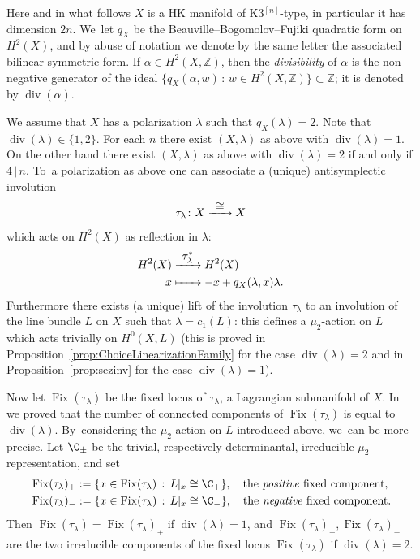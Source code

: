 \documentclass[JEP,XML,SOM,Unicode,published]{cedram}
\newcommand\To[1]{\mathchoice{\xrightarrow{\textstyle\kern4pt#1\kern3pt}}{\stackrel{#1}{\longrightarrow}}{}{}}
\newcommand\Mto[1]{\mathrel{\mapstochar\To{#1}}}
\newcommand{\HK}{\textup{HK}\xspace}
\newcommand{\ZZ}{{\mathbb Z}}\let\Z\ZZ
\DeclareMathOperator{\divisore}{div}\let\div\divisore
\DeclareMathOperator{\Fix}{Fix}
\theoremstyle{definition}
\begin{document}
Here and in what follows $X$ is a \HK manifold of K3$^{[n]}$-type, in particular it has dimension $2n$. We~let $q_X$ be the Beauville--Bogomolov--Fujiki quadratic form on $H^2(X)$, and by abuse of notation we denote by the same letter the associated bilinear symmetric form.
If $\alpha\in H^2(X,\ZZ)$, then the \emph{divisibility} of $\alpha$ is the non negative generator of the ideal $\{q_X(\alpha,w)\,:\,w\in H^2(X,\ZZ)\}\subset\ZZ$; it is denoted by $\divisore(\alpha)$.

We assume that $X$ has a polarization $\lambda$ such that $q_X(\lambda)=2$. Note that $\divisore(\lambda)\in\{1,2\}$. For each $n$ there exist $(X,\lambda)$ as above with
$\divisore(\lambda)=1$. On the other hand there exist $(X,\lambda)$ as above with
$\divisore(\lambda)=2$ if and only if
$4\,|\,n$. To~a polarization as above one can associate a (unique) antisymplectic involution
\[
\tau_{\lambda}\colon X\To{\cong}X
\]
which acts on $H^2(X)$ as reflection in $\lambda$:
\begin{equation}\label{riflessione}
\begin{aligned}
H^2(X) & \To{\tau^{*}_{\lambda}}  H^2(X) \\
x & \Mto{\hphantom{\tau^{*}_{\lambda}}}  -x+q_X(\lambda,x)\lambda.
\end{aligned}
\end{equation}
Furthermore there exists (a unique) lift of the involution $\tau_{\lambda}$ to an involution of the line bundle $L$ on $X$ such that $\lambda=c_1(L)$: this
defines a $\mu_2$-action on $L$ which acts trivially on $H^0(X,L)$ (this is proved in Proposition~\ref{prop:ChoiceLinearizationFamily} for the case $\divisore(\lambda)=2$ and in Proposition~\ref{prop:sezinv} for the case $\divisore(\lambda)=1$).

Now let $\Fix(\tau_{\lambda})$ be the fixed locus of $\tau_{\lambda}$, a Lagrangian submanifold of $X$.
In~\cite{involutions1} we proved that the number of connected components of $\Fix(\tau_{\lambda})$ is equal to $\divisore(\lambda)$. By~considering the $\mu_2$-action on $L$ introduced above, we~can be more precise.
Let $\C_{\pm}$ be the trivial, respectively determinantal, irreducible $\mu_2$-representation, and set
\begin{equation*}\label{eq:SigmaPM}
\begin{split}
&\Fix(\tau_{\lambda})_+ :=\{ x\in \Fix(\tau_\lambda) \,:\, L\vert_x \cong \C_+\},\quad \text{the \emph{positive} fixed component},\\
&\Fix(\tau_{\lambda})_- :=\{ x\in \Fix(\tau_\lambda) \,:\, L\vert_x \cong \C_-\},\quad \text{the \emph{negative} fixed component}.
\end{split}
\end{equation*}
Then $\Fix(\tau_{\lambda})=\Fix(\tau_{\lambda})_+$ if $\divisore(\lambda)=1$, and $\Fix(\tau_{\lambda})_+,\Fix(\tau_{\lambda})_-$ are the two irreducible components of the fixed locus $\Fix(\tau_{\lambda})$ if $\divisore(\lambda)=2$.
\end{document}

